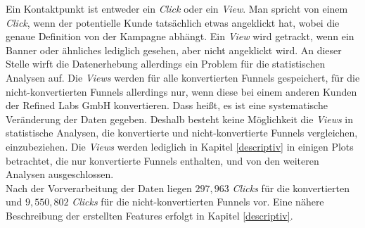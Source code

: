 Ein Kontaktpunkt ist entweder ein \textit{Click} oder ein \textit{View}. Man spricht von einem \textit{Click}, wenn der potentielle Kunde tatsächlich etwas angeklickt hat, wobei die genaue Definition von der Kampagne abhängt. Ein \textit{View} wird getrackt, wenn ein Banner oder ähnliches lediglich gesehen, aber nicht angeklickt wird. An dieser Stelle wirft die Datenerhebung allerdings ein Problem für die statistischen Analysen auf. Die \textit{Views} werden für alle konvertierten Funnels gespeichert, für die nicht-konvertierten Funnels allerdings nur, wenn diese bei einem anderen Kunden der Refined Labs GmbH konvertieren. Dass heißt, es ist eine systematische Veränderung der Daten gegeben. Deshalb besteht keine Möglichkeit die \textit{Views} in statistische Analysen, die konvertierte und nicht-konvertierte Funnels vergleichen, einzubeziehen. Die \textit{Views} werden lediglich in Kapitel \ref{descriptiv} in einigen Plots betrachtet, die nur konvertierte Funnels enthalten, und von den weiteren Analysen ausgeschlossen.\\
Nach der Vorverarbeitung der Daten liegen $ 297,963 $ \textit{Clicks} für die konvertierten und $ 9,550,802 $ \textit{Clicks} für die nicht-konvertierten Funnels vor. Eine nähere Beschreibung der erstellten Features erfolgt in Kapitel \ref{descriptiv}.



